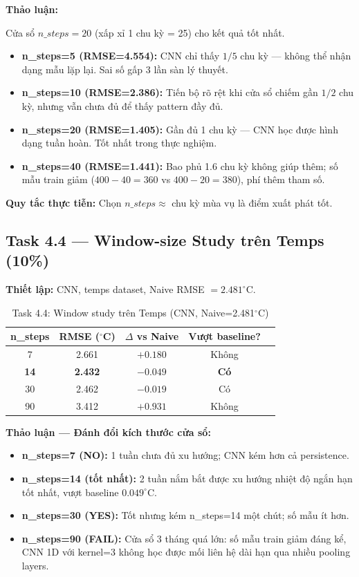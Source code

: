 \documentclass[12pt,a4paper]{article}
\begin{document}
\textbf{Thảo luận:}

Cửa sổ $n\_steps = 20$ (xấp xỉ 1 chu kỳ = 25) cho kết quả tốt nhất.

\begin{itemize}
    \item \textbf{n\_steps=5 (RMSE=4.554):} CNN chỉ thấy $1/5$ chu kỳ --- không thể nhận dạng mẫu lặp lại. Sai số gấp 3 lần sàn lý thuyết.
    \item \textbf{n\_steps=10 (RMSE=2.386):} Tiến bộ rõ rệt khi cửa sổ chiếm gần $1/2$ chu kỳ, nhưng vẫn chưa đủ để thấy pattern đầy đủ.
    \item \textbf{n\_steps=20 (RMSE=1.405):} Gần đủ 1 chu kỳ --- CNN học được hình dạng tuần hoàn. Tốt nhất trong thực nghiệm.
    \item \textbf{n\_steps=40 (RMSE=1.441):} Bao phủ 1.6 chu kỳ không giúp thêm; số mẫu train giảm ($400-40 = 360$ vs $400-20 = 380$), phí thêm tham số.
\end{itemize}

\textbf{Quy tắc thực tiễn:} Chọn $n\_steps \approx$ chu kỳ mùa vụ là điểm xuất phát tốt.

\subsection{Task 4.4 --- Window-size Study trên Temps (10\%)}

\textbf{Thiết lập:} CNN, temps dataset, Naive RMSE $= 2.481^\circ$C.

\begin{table}[H]
\centering
\caption{Task 4.4: Window study trên Temps (CNN, Naive=2.481$^\circ$C)}
\begin{tabular}{ccccc}
\toprule
\textbf{n\_steps} & \textbf{RMSE ($^\circ$C)} & \textbf{$\Delta$ vs Naive} & \textbf{Vượt baseline?} \\
\midrule
7  & 2.661 & $+0.180$ & Không \\
\textbf{14} & \textbf{2.432} & $-0.049$ & \textbf{Có} \\
30 & 2.462 & $-0.019$ & Có \\
90 & 3.412 & $+0.931$ & Không \\
\bottomrule
\end{tabular}
\end{table}

\textbf{Thảo luận --- Đánh đổi kích thước cửa sổ:}

\begin{itemize}
    \item \textbf{n\_steps=7 (NO):} 1 tuần chưa đủ xu hướng; CNN kém hơn cả persistence.
    \item \textbf{n\_steps=14 (tốt nhất):} 2 tuần nắm bắt được xu hướng nhiệt độ ngắn hạn tốt nhất, vượt baseline $0.049^\circ$C.
    \item \textbf{n\_steps=30 (YES):} Tốt nhưng kém n\_steps=14 một chút; số mẫu ít hơn.
    \item \textbf{n\_steps=90 (FAIL):} Cửa sổ 3 tháng quá lớn: số mẫu train giảm đáng kể, CNN 1D với kernel=3 không học được mối liên hệ dài hạn qua nhiều pooling layers.
\end{itemize}
\end{document}
